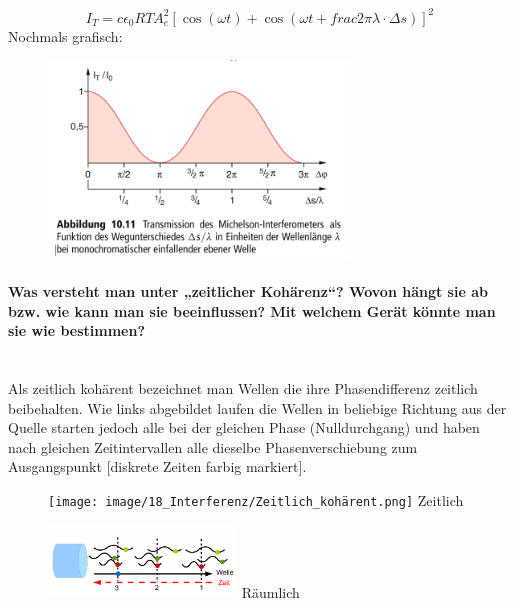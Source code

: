 \documentclass[a4paper, 11pt, ngerman, parskip=half]{scrartcl}
\newcommand{\myparagraph}[1]{\paragraph{#1}\mbox{}\\}
\begin{document}
\begin{equation}
    I_T = c \epsilon_0 RT A_e^2[\cos(\omega t) + \cos(\omega t + frac{2\pi}{\lambda}\cdot \Delta s)]^2
\end{equation}
Nochmals grafisch:
\begin{figure}[H]
    \centering
    \includegraphics[width=8cm]{image/18_Interferenz/Michelson_Funktion_Wegunterschied.png}
\end{figure}

\myparagraph{Was versteht man unter „zeitlicher Kohärenz“? Wovon hängt sie ab bzw. wie kann man sie
beeinflussen? Mit welchem Gerät könnte man sie wie bestimmen?}

Als \glqq zeitlich kohärent \grqq bezeichnet man Wellen die ihre Phasendifferenz zeitlich beibehalten. Wie links abgebildet laufen die Wellen in beliebige Richtung aus der Quelle
starten jedoch alle bei der gleichen Phase (Nulldurchgang) und haben nach gleichen Zeitintervallen alle dieselbe Phasenverschiebung zum Ausgangspunkt [diskrete Zeiten farbig markiert].
\begin{figure}[H]
    \centering
    \begin{minipage}[b]{0.3\textwidth}
        \centering
        \texttt{[image: image/18\_Interferenz/Zeitlich\_kohärent.png]}
        Zeitlich
    \end{minipage}
    \hspace{2cm}
    \begin{minipage}[b]{0.3\textwidth}
        \centering
        \includegraphics[width=5cm]{image/18_Interferenz/räumliche_kohärenz.png}
        Räumlich
    \end{minipage}
\end{figure}
\end{document}
